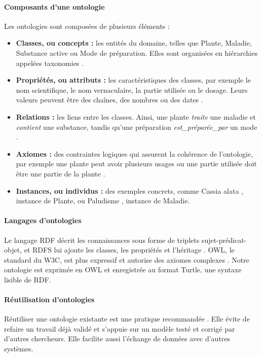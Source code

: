 \paragraph{Composants d'une ontologie}
Les ontologies sont composées de plusieurs éléments \cite{studer1998knowledge} :
\begin{itemize}[label={$\bullet$}, leftmargin=1cm]
\item \textbf{Classes, ou concepts :} les entités du domaine, telles que Plante, Maladie, Substance active ou Mode de préparation. Elles sont organisées en hiérarchies appelées taxonomies \cite{studer1998knowledge}.
    \item \textbf{Propriétés, ou attributs :} les caractéristiques des classes, par exemple le nom scientifique, le nom vernaculaire, la partie utilisée ou le dosage. Leurs valeurs peuvent être des chaînes, des nombres ou des dates \cite{studer1998knowledge}.
    \item \textbf{Relations :} les liens entre les classes. Ainsi, une plante \textit{\og traite \fg} une maladie et \textit{\og contient \fg} une substance, tandis qu'une préparation \textit{\og est\_préparée\_par \fg} un mode \cite{studer1998knowledge}.
    \item \textbf{Axiomes :} des contraintes logiques qui assurent la cohérence de l'ontologie, par exemple \og une plante peut avoir plusieurs usages \fg{} ou \og une partie utilisée doit être une partie de la plante \fg \cite{studer1998knowledge}.
    \item \textbf{Instances, ou individus :} des exemples concrets, comme \og Cassia alata \fg{}, instance de Plante, ou \og Paludisme \fg{}, instance de Maladie.
\end{itemize}

\paragraph{Langages d'ontologies}
Le langage RDF décrit les connaissances sous forme de triplets sujet-prédicat-objet, et RDFS lui ajoute les classes, les propriétés et l'héritage \cite{w3crdf2014}. OWL, le standard du W3C, est plus expressif et autorise des axiomes complexes \cite{w3cowl2012}. Notre ontologie est exprimée en OWL et enregistrée au format Turtle, une syntaxe lisible de RDF.

\paragraph{Réutilisation d'ontologies}
Réutiliser une ontologie existante est une pratique recommandée \cite{mariano_fernandez-lopez_pdf_nodate}. Elle évite de refaire un travail déjà validé et s'appuie sur un modèle testé et corrigé par d'autres chercheurs. Elle facilite aussi l'échange de données avec d'autres systèmes.

